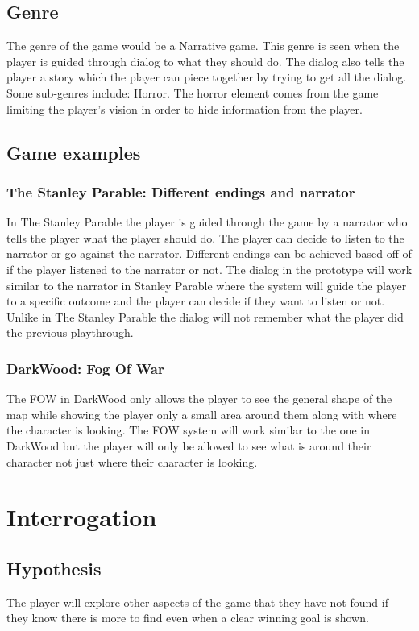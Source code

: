 \documentclass{article}
\begin{document}
\subsection{Genre}
The genre of the game would be a Narrative game. This genre is seen when the player
is guided through dialog to what they should do. The \gls{dialog} also tells the 
player a story which the player can piece together by trying to get all the dialog.
\newline
Some sub-genres include: Horror. The horror element comes from the game limiting
the player's vision in order to hide information from the player.



\subsection{Game examples}
\subsubsection*{The Stanley Parable: Different endings and narrator}
In The Stanley Parable the player is guided through the game by a narrator who tells
the player what the player should do. The player can decide to listen to the narrator
or go against the narrator. Different endings can be achieved based off of if the 
player listened to the narrator or not.
The \gls{dialog} in the prototype will work similar to the narrator in Stanley Parable
where the system will guide the player to a specific outcome and the player can decide
if they want to listen or not. Unlike in The Stanley Parable the \gls{dialog} will not
remember what the player did the previous playthrough.
\subsubsection*{DarkWood: Fog Of War}
The \gls{FOW} in DarkWood only allows the player to see the general shape of the \gls{map}
while showing the player only a small area around them along with where the character is 
looking. The \gls{FOW} system will work similar to the one in DarkWood but the player
will only be allowed to see what is around their character not just where their character
is looking.


\newpage
\section{Interrogation}

\subsection{Hypothesis}
The player will explore other aspects of the game that they have not found if
they know there is more to find even when a clear winning goal is shown.
\end{document}

